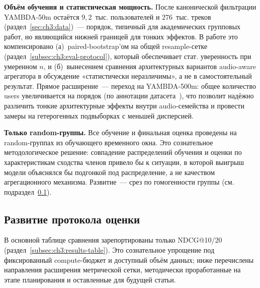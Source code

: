 \textbf{Объём обучения и статистическая мощность.} После канонической фильтрации YAMBDA-50m остаётся $9{,}2$~тыс. пользователей и $276$~тыс. треков (раздел~\ref{sec:ch3:data})~--- порядок, типичный для академических групповых работ, но являющийся нижней границей для тонких эффектов. В работе это компенсировано (а)~paired-bootstrap'ом на общей resample-сетке (раздел~\ref{subsec:ch3:eval-protocol}), который обеспечивает стат. уверенность при умеренном $n$, и (б)~вынесением сравнения архитектурных вариантов audio-aware агрегатора в обсуждение «статистически неразличимы», а не в самостоятельный результат. Прямое расширение~--- переход на YAMBDA-500m: общее количество users увеличивается на порядок (по аннотации датасета~\cite{yambda2025}), что позволит надёжно различить тонкие архитектурные эффекты внутри audio-семейства и провести замеры на гетерогенных подвыборках с меньшей дисперсией.

\textbf{Только random-группы.} Все обучение и финальная оценка проведены на random-группах из обучающего временного окна. Это сознательное методологическое решение: совпадение распределений обучения и оценки по характеристикам сходства членов привело бы к ситуации, в которой выигрыш модели объяснялся бы подгонкой под распределение, а не качеством агрегационного механизма. Развитие~--- срез по гомогенности группы (см. подраздел~\ref{subsec:ch3:lim-eval-protocol}).

\subsection{Развитие протокола оценки}\label{subsec:ch3:lim-eval-protocol}

В основной таблице сравнения зарепортированы только NDCG@10/20 (раздел~\ref{subsec:ch3:results-table}). Это сознательное упрощение под фиксированный compute-бюджет и доступный объём данных; ниже перечислены направления расширения метрической сетки, методически проработанные на этапе планирования и оставленные для будущей статьи.

